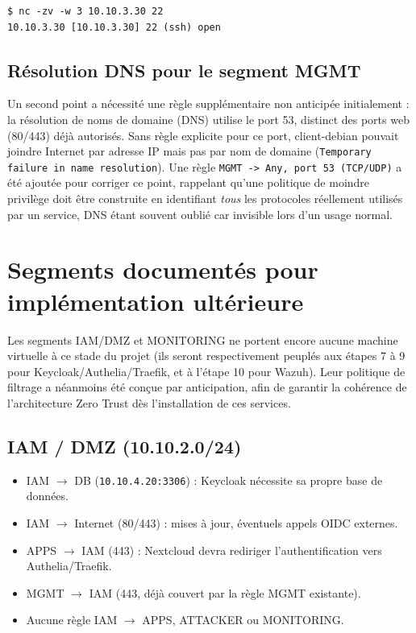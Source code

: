 \begin{lstlisting}
$ nc -zv -w 3 10.10.3.30 22
10.10.3.30 [10.10.3.30] 22 (ssh) open
\end{lstlisting}

\subsection{Résolution DNS pour le segment MGMT}

Un second point a nécessité une règle supplémentaire non anticipée
initialement : la résolution de noms de domaine (DNS) utilise le port 53,
distinct des ports web (80/443) déjà autorisés. Sans règle explicite pour
ce port, client-debian pouvait joindre Internet par adresse IP mais pas
par nom de domaine (\texttt{Temporary failure in name resolution}). Une
règle \texttt{MGMT -> Any, port 53 (TCP/UDP)} a été ajoutée pour corriger
ce point, rappelant qu'une politique de moindre privilège doit être
construite en identifiant \emph{tous} les protocoles réellement utilisés
par un service, DNS étant souvent oublié car invisible lors d'un usage
normal.

\section{Segments documentés pour implémentation ultérieure}

Les segments IAM/DMZ et MONITORING ne portent encore aucune machine
virtuelle à ce stade du projet (ils seront respectivement peuplés aux
étapes 7 à 9 pour Keycloak/Authelia/Traefik, et à l'étape 10 pour Wazuh).
Leur politique de filtrage a néanmoins été conçue par anticipation, afin
de garantir la cohérence de l'architecture Zero Trust dès l'installation
de ces services.

\subsection{IAM / DMZ (10.10.2.0/24)}

\begin{itemize}
    \item IAM $\rightarrow$ DB (\texttt{10.10.4.20:3306}) : Keycloak
    nécessite sa propre base de données.
    \item IAM $\rightarrow$ Internet (80/443) : mises à jour, éventuels
    appels OIDC externes.
    \item APPS $\rightarrow$ IAM (443) : Nextcloud devra rediriger
    l'authentification vers Authelia/Traefik.
    \item MGMT $\rightarrow$ IAM (443, déjà couvert par la règle MGMT
    existante).
    \item Aucune règle IAM $\rightarrow$ APPS, ATTACKER ou MONITORING.
\end{itemize}

